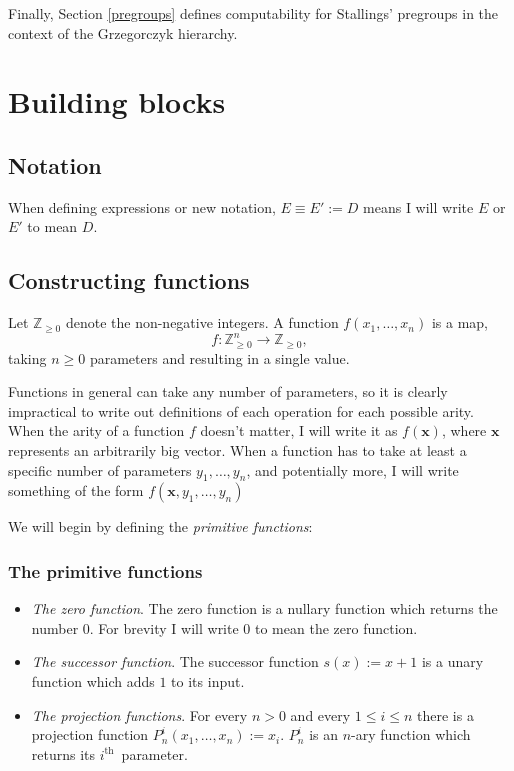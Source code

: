 \documentclass[a4paper]{article}
\newcommand{\ZZ}{\mathbb{Z}}
\newcommand{\ith}{$i^{\textrm{th}}$~}
\newcommand{\xvec}{\mathbf{x}}	%
\theoremstyle{plain}
\theoremstyle{definition}
\begin{document}
Finally, Section \ref{pregroups} defines computability for Stallings' pregroups \cite{Stallings_1971} in the context of the Grzegorczyk hierarchy.


\section{Building blocks \label{buildingblocks}}

\subsection{Notation}
When defining expressions or new notation, $E \equiv E' := D$ means I will write $E$ or $E'$ to mean $D$.

\subsection{Constructing functions}
Let $\ZZ_{\geq 0}$ denote the non-negative integers. A function $f(x_1, \dots, x_n)$ is a map,
\[f: \ZZ_{\geq 0}^n \rightarrow \ZZ_{\geq 0},\]
taking $n \geq 0$ parameters and resulting in a single value.

Functions in general can take any number of parameters, so it is clearly impractical to write out definitions of each operation for each possible arity. When the arity of a function $f$ doesn't matter, I will write it as $f(\xvec)$, where $\xvec$ represents an arbitrarily big vector.  When a function has to take at least a specific number of parameters $y_1, \dots, y_n$, and potentially more, I will write something of the form $f(\xvec, y_1, \dots, y_n)$

We will begin by defining the {\it primitive functions}:

\subsubsection{The primitive functions}

\begin{itemize}
	\item {\em The zero function}. The zero function is a nullary function which returns the number $0$. For brevity I will write $0$ to mean the zero function.
	\item {\em The successor function}. The successor function $s(x) := x + 1$ is a unary function which adds $1$ to its input.
	\item {\em The projection functions}. For every $n > 0 $ and every $1 \leq i \leq n$ there is a projection function $P_n^i(x_1, \dots, x_n) := x_i$. $P_n^i$ is an $n$-ary function which returns its \ith parameter.
\end{itemize}
\end{document}
